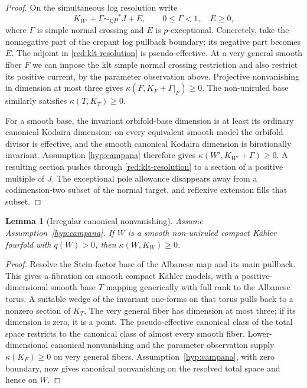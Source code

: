 \documentclass[11pt,letterpaper]{article}
\newcommand{\Q}{\mathbb{Q}}
\newtheorem{lemma}[theorem]{Lemma}
\theoremstyle{definition}
\theoremstyle{remark}
\begin{document}
\begin{proof}
On the simultaneous log resolution write
\begin{equation}\label{red:klt-resolution}
 K_{W'}+\Gamma\sim_{\Q}p^*J+E,
 \qquad 0\leq\Gamma<1,\quad E\geq0,
\end{equation}
where \(\Gamma\) is simple normal crossing and \(E\) is
\(p\)-exceptional. Concretely, take the nonnegative part of the crepant
log pullback boundary; its negative part becomes \(E\).
The adjoint in \eqref{red:klt-resolution} is pseudo-effective. At a
very general smooth fiber \(F\) we can impose the klt simple normal
crossing restriction and also restrict its positive current, by the
parameter observation above. Projective nonvanishing in dimension at
most three gives \(\kappa(F,K_F+\Gamma|_F)\geq0\). The non-uniruled
base similarly satisfies \(\kappa(T,K_T)\geq0\).

For a smooth base, the invariant orbifold-base dimension is at least
its ordinary canonical Kodaira dimension: on every equivalent smooth
model the orbifold divisor is effective, and the smooth canonical
Kodaira dimension is birationally invariant. Assumption
\ref{hyp:campana} therefore gives
\(\kappa(W',K_{W'}+\Gamma)\geq0\). A resulting section pushes through
\eqref{red:klt-resolution} to a section of a positive multiple of
\(J\). The exceptional pole allowance disappears away from a
codimension-two subset of the normal target, and reflexive extension
fills that subset.
\end{proof}

\begin{lemma}[Irregular canonical nonvanishing]\label{red:irregular}
Assume Assumption~\ref{hyp:campana}. If \(W\) is a smooth non-uniruled
compact Kähler fourfold with \(q(W)>0\), then \(\kappa(W,K_W)\geq0\).
\end{lemma}

\begin{proof}
Resolve the Stein-factor base of the Albanese map and its main pullback.
This gives a fibration on smooth compact Kähler models, with a
positive-dimensional smooth base \(T\) mapping generically with full
rank to the Albanese torus. A suitable wedge of the invariant
one-forms on that torus pulls back to a nonzero section of \(K_T\).
The very general fiber has dimension at most three; if its dimension
is zero, it is a point. The pseudo-effective canonical class of the
total space restricts to the canonical class of almost every smooth
fiber. Lower-dimensional canonical nonvanishing and the parameter
observation supply \(\kappa(K_F)\geq0\) on very general fibers.
Assumption~\ref{hyp:campana}, with zero boundary, now gives canonical
nonvanishing on the resolved total space and hence on \(W\).
\end{proof}
\end{document}
